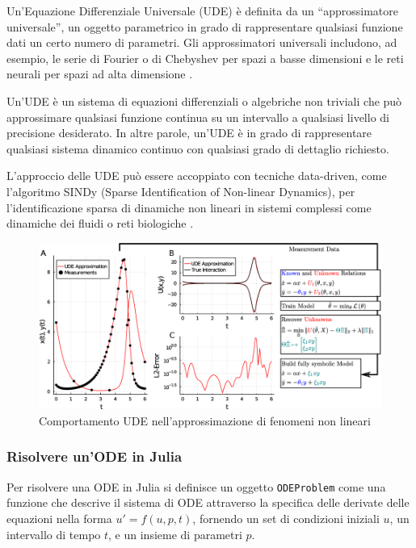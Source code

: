 Un'Equazione Differenziale Universale (UDE) è definita da un 
``approssimatore universale'', un oggetto parametrico in grado di 
rappresentare qualsiasi funzione dati un certo numero di parametri. 
Gli approssimatori universali includono, ad esempio, le serie di Fourier 
o di Chebyshev per spazi a basse dimensioni e le reti neurali per spazi 
ad alta dimensione \cite{rackauckas2020universal}.

Un'UDE è un sistema di equazioni differenziali o algebriche non triviali 
che può approssimare qualsiasi funzione continua su un intervallo a 
qualsiasi livello di precisione desiderato. In altre parole, un'UDE è 
in grado di rappresentare qualsiasi sistema dinamico continuo con 
qualsiasi grado di dettaglio richiesto.

L'approccio delle UDE può essere accoppiato con tecniche data-driven, 
come l'algoritmo SINDy (Sparse Identification of Non-linear Dynamics), 
per l'identificazione sparsa di dinamiche non lineari in sistemi 
complessi come dinamiche dei fluidi o reti biologiche \cite{datadrivendiffeq}.

\begin{figure}[H]
    \begin{center}
        \includegraphics[width=\textwidth]{img/ude_approx.png}
        \caption{Comportamento UDE nell'approssimazione di fenomeni non lineari \cite{rackauckas2020universal}}
        \label{fig:UDE_approx}
    \end{center}
\end{figure}

\subsubsection*{Risolvere un'ODE in Julia}

Per risolvere una ODE in Julia si definisce un oggetto \texttt{ODEProblem} come 
una funzione che descrive il sistema di ODE attraverso la specifica 
delle derivate delle equazioni nella forma $u' = f(u, p, t)$, fornendo 
un set di condizioni iniziali $u$, un intervallo di tempo $t$, e un 
insieme di parametri $p$.

